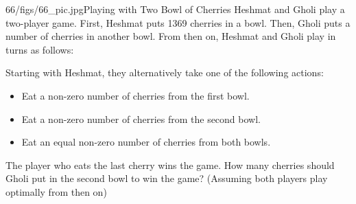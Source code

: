 \begin{problem}{66/figs/66_pic.jpg}{Playing with Two Bowl of Cherries} Heshmat and Gholi play a two-player game. First, Heshmat puts 1369 cherries in a bowl. Then, Gholi puts a number of cherries in another bowl. From then on, Heshmat and Gholi play in turns as follows:
	
	Starting with Heshmat, they alternatively take one of the following actions:
	\begin{itemize}
	\item Eat a non-zero number of cherries from the first bowl.
	\item Eat a non-zero number of cherries from the second bowl.
	\item Eat an equal non-zero number of cherries from both bowls.
	\end{itemize}
	The player who eats the last cherry wins the game. How many cherries should Gholi put in the second bowl to win the game? (Assuming both players play optimally from then on)
\end{problem}
